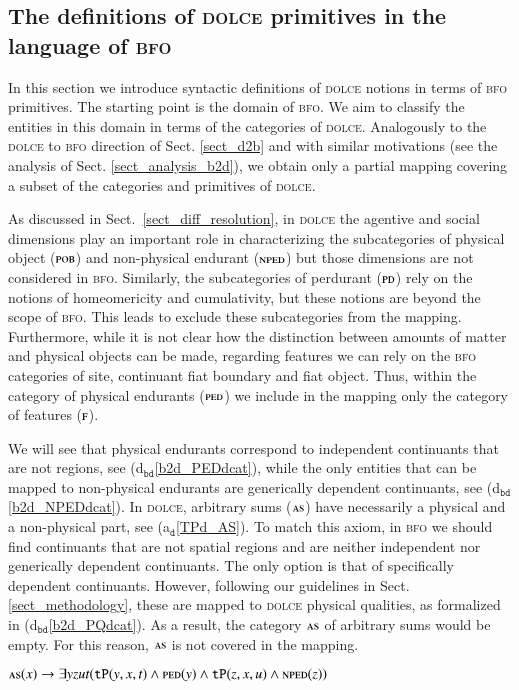 \documentclass[ao]{iosart2x}
\newcommand{\bflist}{\begin{list}{}{\setlength{\topsep}{2mm}\setlength{\parsep}{0mm}\setlength{\leftmargin}{9.2mm}\setlength{\labelwidth}{8mm}}}
\newcommand{\eflist}{\end{list}}
\newcommand{\dolceAxLabel}{\textrm{a$_\texttt{d}$}}
\newcommand{\bdDefLabel}{\textrm{d$_\texttt{bd}$}}
\newcounter{cntax}
\newcommand{\dolceax}[1]{\refstepcounter{cntax}\begin{small}{\bf \dolceAxLabel\thecntax\label{#1}}\end{small}}
\newcommand{\refdolceax}[1]{({\dolceAxLabel}\ref{#1})}
\newcommand{\refbddf}[1]{({\bdDefLabel}\ref{#1})}
\newcommand{\pr}[1]{\mathtt{#1}}
\newcommand{\dolce}{{\textsc{dolce}}}
\newcommand{\bfo}{{\textsc{bfo}}}
\newcommand {\ASdcat} {\textsc{as}}
\newcommand {\Fdcat} {\textsc{f}}
\newcommand {\NPEDdcat} {\textsc{nped}}
\newcommand {\PDdcat} {\textsc{pd}}
\newcommand {\PEDdcat} {\textsc{ped}}
\newcommand {\POBdcat} {\textsc{pob}}
\newcommand {\TPd} {\ensuremath{\pr{tP}}}
\begin{document}
\subsection{The definitions of {\dolce} primitives in the language of {\bfo}}\label{sect_mappings_b2d}

In this section we introduce syntactic definitions of {\dolce} notions in terms of {\bfo} primitives. 
The starting point is the domain of {\bfo}. We aim to classify the entities in this domain in terms of the categories of {\dolce}.
Analogously to the {\dolce} to {\bfo} direction of Sect. \ref{sect_d2b} and with similar motivations (see the analysis of Sect. \ref{sect_analysis_b2d}), we obtain only a partial mapping covering a subset of the categories and primitives of {\dolce}.  

As discussed in Sect.~\ref{sect_diff_resolution}, in {\dolce} the agentive and social dimensions play an important role in characterizing the subcategories of physical object ($\POBdcat$) and non-physical endurant ($\NPEDdcat$) but those dimensions are not considered in {\bfo}. Similarly, the subcategories of perdurant ($\PDdcat$) rely on the notions of homeomericity and cumulativity, but these notions are beyond the scope of {\bfo}. This leads to exclude these subcategories from the mapping. Furthermore, while it is not clear how the distinction between amounts of matter and physical objects can be made, regarding features we can rely on the {\bfo} categories of site, continuant fiat boundary and fiat object. Thus, within the category of physical endurants ($\PEDdcat$) we include in the mapping only the category of features ($\Fdcat$). 

We will see that physical endurants correspond to independent continuants that are not regions,
see \refbddf{b2d_PEDdcat}, while the only entities that can be mapped to non-physical endurants are generically dependent continuants, see \refbddf{b2d_NPEDdcat}. In {\dolce}, arbitrary sums ($\ASdcat$) have necessarily a physical and a non-physical part, see \refdolceax{TPd_AS}. To match this axiom, in {\bfo} we should find continuants that are not spatial regions and are neither independent nor generically dependent continuants. The only option is that of specifically dependent continuants. However, following our guidelines in Sect. \ref{sect_methodology}, these are mapped to {\dolce} physical qualities, as formalized in \refbddf{b2d_PQdcat}. As a result, the category $\ASdcat$ of arbitrary sums would be empty. For this reason, $\ASdcat$ is not covered in the mapping.   
%
\bflist
\item[\dolceax{TPd_AS}] $\ASdcat(x) \to \exists yzut(\TPd(y,x,t) \land \PEDdcat(y) \land \TPd(z,x,u) \land \NPEDdcat(z))$  
\eflist
\end{document}

